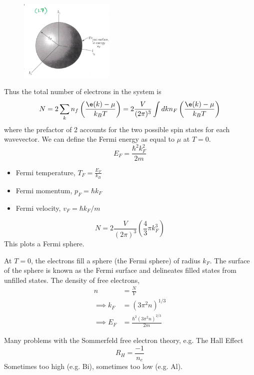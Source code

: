 \documentclass[a4paper, 11pt, normalem]{report}
\begin{document}
\begin{figure}
    \centering
    \includegraphics[width=0.4\textwidth]{fermisph.png}
\end{figure}
Thus the total number of electrons in the system is 
\begin{equation}
    N = 2\sum_k n_f\left(\frac{\e(k) - \mu}{k_BT}\right) = 2\frac{V}{(2\pi)^3}\int dk n_F\left(\frac{\e(k) - \mu}{k_BT}\right)
\end{equation}
where the prefactor of 2 accounts for the two possible spin states for each wavevector. 
We can define the Fermi energy as equal to $\mu$ at $T=0$.
\begin{equation}
    E_F = \frac{\hbar^2k_F^2}{2m}
\end{equation}
\begin{itemize}
    \item Fermi temperature, $T_F = \frac{E_F}{k_B}$
    \item Fermi momentum, $p_F = \hbar k_F$
    \item Fermi velocity, $v_F = \hbar k_F/m$
\end{itemize}
\begin{equation}
    N = 2\frac{V}{(2\pi)^3}\left(\frac{4}{3}\pi k_F^3\right)
\end{equation}
This plots a Fermi sphere.

At $T=0$, the electrons fill a sphere (the Fermi sphere) of radius $k_F$.
The surface of the sphere is known as the Fermi surface and delineates filled states from unfilled states. 
The density of free electrons,
\begin{align}
    n &= \frac{N}{V} \\
    \implies k_F &= (3\pi^2n)^{1/3} \\
    \implies E_F &= \frac{\hbar^2(3\pi^2n)^{2/3}}{2m}
\end{align}

Many problems with the Sommerfeld free electron theory, e.g. The Hall Effect
\begin{equation} 
    R_H = \frac{-1}{n_e}
\end{equation}
Sometimes too high (e.g. Bi), sometimes too low (e.g. Al).
\end{document}
